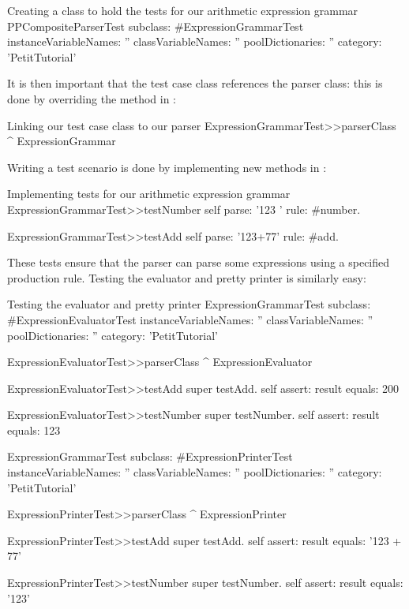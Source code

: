 \documentclass[a4paper,10pt,twoside]{book}
\begin{document}
\begin{script}{Creating a class to hold the tests for our arithmetic expression grammar}
PPCompositeParserTest subclass: #ExpressionGrammarTest
  instanceVariableNames: ''
  classVariableNames: ''
  poolDictionaries: ''
  category: 'PetitTutorial'
\end{script}

It is then important that the test case class references the parser
class: this is done by overriding the
 method in
:

\begin{script}{Linking our test case class to our parser}
ExpressionGrammarTest>>parserClass
  ^ ExpressionGrammar
\end{script}

Writing a test scenario is done by implementing new methods in
:

\begin{script}{Implementing tests for our arithmetic expression grammar}
ExpressionGrammarTest>>testNumber
  self parse: '123 ' rule: #number.

ExpressionGrammarTest>>testAdd
  self parse: '123+77' rule: #add.
\end{script}

These tests ensure that the  parser can parse
some expressions using a specified production rule. Testing the
evaluator and pretty printer is similarly easy:

\begin{script}{Testing the evaluator and pretty printer}
ExpressionGrammarTest subclass: #ExpressionEvaluatorTest
  instanceVariableNames: ''
  classVariableNames: ''
  poolDictionaries: ''
  category: 'PetitTutorial'

ExpressionEvaluatorTest>>parserClass
  ^ ExpressionEvaluator

ExpressionEvaluatorTest>>testAdd
  super testAdd.
  self assert: result equals: 200

ExpressionEvaluatorTest>>testNumber
  super testNumber.
  self assert: result equals: 123

ExpressionGrammarTest subclass: #ExpressionPrinterTest
  instanceVariableNames: ''
  classVariableNames: ''
  poolDictionaries: ''
  category: 'PetitTutorial'

ExpressionPrinterTest>>parserClass
  ^ ExpressionPrinter

ExpressionPrinterTest>>testAdd
  super testAdd.
  self assert: result equals: '123 + 77'

ExpressionPrinterTest>>testNumber
  super testNumber.
  self assert: result equals: '123'
\end{script}
\end{document}
